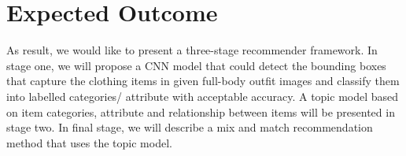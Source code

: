 \section{Expected Outcome}
As result, we would like to present a three-stage recommender framework. In stage one, we will propose a CNN model that could detect the bounding boxes that capture the clothing items in given full-body outfit images and classify them into labelled categories/ attribute with acceptable accuracy. A topic model based on item categories, attribute and relationship between items will be presented in stage two. In final stage, we will describe a mix and match recommendation method that uses the topic model.